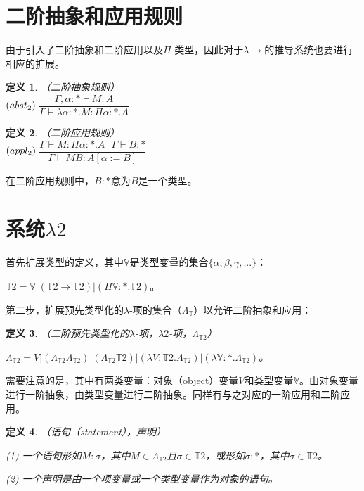 \documentclass[UTF8]{article}
\newtheorem{thm}{定义}[section]
\begin{document}
	\section{二阶抽象和应用规则}
		由于引入了二阶抽象和二阶应用以及$\Pi$-类型，因此对于$\lambda{\rightarrow}$的推导系统也要进行相应的扩展。
		
		\begin{thm}（二阶抽象规则）\\
			
			${\rm(}abst_2{\rm)}$$\ \dfrac{\Gamma,\alpha:*\vdash M:A}{\Gamma\vdash\lambda\alpha:*.M:\Pi\alpha:*.A}$
		\end{thm}
	
		\begin{thm}（二阶应用规则）\\
			
			${\rm(}appl_2{\rm)}$$\ \dfrac{\Gamma\vdash M:\Pi\alpha:*.A\ \ \ \Gamma\vdash B:*}{\Gamma\vdash MB:A[\alpha:=B]}$
		\end{thm}
	
		在二阶应用规则中，$B:*$意为$B$是一个类型。
		
	\section{系统$\lambda{2}$}
		首先扩展类型的定义，其中$\mathbb{V}$是类型变量的集合$\{\alpha,\beta,\gamma,...\}$：
		
		$\mathbb{T}2 = \mathbb{V}|(\mathbb{T}2\rightarrow\mathbb{T}2)|(\Pi\mathbb{V}:*.\mathbb{T}2)$。
		
		第二步，扩展预先类型化的$\lambda$-项的集合（$\Lambda_{\mathbb{T}}$）以允许二阶抽象和应用：
		
		\begin{thm}（二阶预先类型化的$\lambda$-项，$\lambda{2}$-项，$\Lambda_{\mathbb{T}2}$）
			
			$\Lambda_{\mathbb{T}2} = V|(\Lambda_{\mathbb{T}2}\Lambda_{\mathbb{T}2})|(\Lambda_{\mathbb{T}2}\mathbb{T}2)|(\lambda V:\mathbb{T}2.\Lambda_{\mathbb{T}2})|(\lambda\mathbb{V}:*.\Lambda_{\mathbb{T}2})$。
		\end{thm}
	
		需要注意的是，其中有两类变量：对象（object）变量$V$和类型变量$\mathbb{V}$。由对象变量进行一阶抽象，由类型变量进行二阶抽象。同样有与之对应的一阶应用和二阶应用。
		
		\begin{thm}（语句（statement），声明）
			
			(1) 一个语句形如$M:\sigma$，其中$M\in\Lambda_{\mathbb{T}2}$且$\sigma\in\mathbb{T}2$，或形如$\sigma:*$，其中$\sigma\in\mathbb{T}2$。
			
			(2) 一个声明是由一个项变量或一个类型变量作为对象的语句。
		\end{thm}
		
\end{document}
